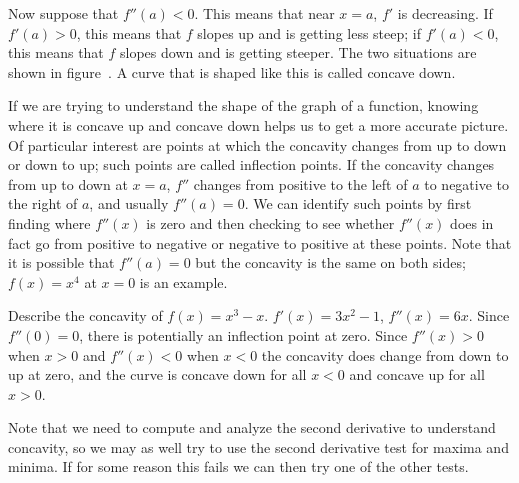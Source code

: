 Now suppose that $f''(a)<0$. This means that near $x=a$, $f'$ is
decreasing. If $f'(a)>0$, this means that $f$ slopes up and is getting
less steep; if $f'(a)<0$, this means that $f$ slopes down and is getting
steeper. The two situations are shown in
figure~. A curve that is shaped like this is
called {\dfont concave down.}


If we are trying to understand the shape of the graph of a function,
knowing where it is concave up and concave down helps us to get a more
accurate picture. Of particular interest are points at which the
concavity changes from up to down or down to up; such points are
called {\dfont inflection points.} If the
concavity changes from up to down at $x=a$, $f''$ changes from
positive to the left of $a$ to negative to the right of $a$, and
usually $f''(a)=0$. We can identify such points by first finding where
$f''(x)$ is zero and then checking to see whether $f''(x)$ does in
fact go from positive to negative or negative to positive at these
points. Note that it is possible that $f''(a)=0$ but the concavity is
the same on both sides; $f(x)=x^4$ at $x=0$ is an example.

\begin{example}
Describe the concavity of $f(x)=x^3-x$. $f'(x)=3x^2-1$, $f''(x)=6x$.
Since $f''(0)=0$, there is potentially an inflection point at
zero. Since $f''(x)>0$ when $x>0$ and $f''(x)<0$ when $x<0$ the
concavity does change from down to up at zero, and the curve is
concave down for all $x<0$ and concave up for all $x>0$.
\end{example}

Note that we need to compute and analyze the second derivative to
understand concavity, so we may as well try to use the second
derivative test for maxima and minima. If for some reason this fails
we can then try one of the other tests.

